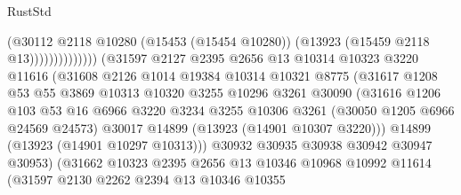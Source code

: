 \begin{lexlean}{RustStd}
\begin{coremodule}
                                            (@30112
                                              @2118
                                              @10280
                                              (@15453 (@15454 @10280))
                                              (@13923 (@15459 @2118 @13))))))))))))))
                      (@31597
                        @2127
                        @2395
                        @2656
                        @13
                        @10314
                        @10323
                        @3220
                        @11616
                        (@31608
                          @2126
                          @1014
                          @19384
                          @10314
                          @10321
                          @8775
                          (@31617
                            @1208
                            @53
                            @55
                            @3869
                            @10313
                            @10320
                            @3255
                            @10296
                            @3261
                            @30090
                            (@31616
                              @1206
                              @103
                              @53
                              @16
                              @6966
                              @3220
                              @3234
                              @3255
                              @10306
                              @3261
                              (@30050 @1205 @6966 @24569 @24573)
                              @30017
                              @14899
                              (@13923 (@14901 @10307 @3220)))
                            @14899
                            (@13923 (@14901 @10297 @10313)))
                          @30932
                          @30935
                          @30938
                          @30942
                          @30947
                          @30953)
                        (@31662
                          @10323
                          @2395
                          @2656
                          @13
                          @10346
                          @10968
                          @10992
                          @11614
                          (@31597
                            @2130
                            @2262
                            @2394
                            @13
                            @10346
                            @10355

\end{coremodule}
\end{lexlean}
